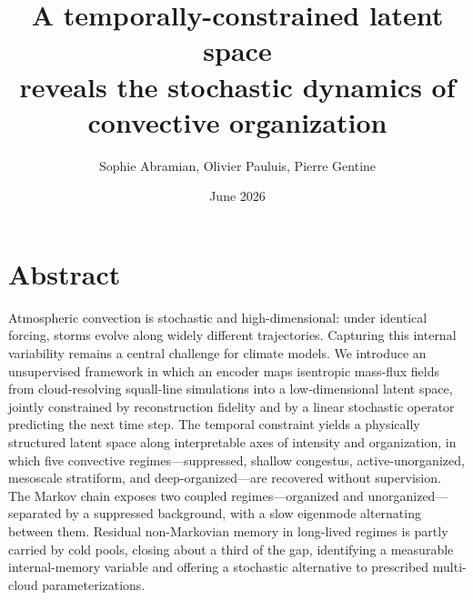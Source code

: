 \documentclass[11pt]{article}
\title{A temporally-constrained latent space \\ reveals the stochastic dynamics of convective organization}
\author{Sophie Abramian, Olivier Pauluis, Pierre Gentine}
\date{June 2026}
\begin{document}
\maketitle


\section*{Abstract}
Atmospheric convection is stochastic and high-dimensional: under identical forcing, storms evolve along widely different trajectories. Capturing this internal variability remains a central challenge for climate models. We introduce an unsupervised framework in which an encoder maps isentropic mass-flux fields from cloud-resolving squall-line simulations into a low-dimensional latent space, jointly constrained by reconstruction fidelity and by a linear stochastic operator predicting the next time step. The temporal constraint yields a physically structured latent space along interpretable axes of intensity and organization, in which five convective regimes---suppressed, shallow congestus, active-unorganized, mesoscale stratiform, and deep-organized---are recovered without supervision. The Markov chain exposes two coupled regimes---organized and unorganized---separated by a suppressed background, with a slow eigenmode alternating between them. Residual non-Markovian memory in long-lived regimes is partly carried by cold pools, closing about a third of the gap, identifying a measurable internal-memory variable and offering a stochastic alternative to prescribed multi-cloud parameterizations.
\end{document}
